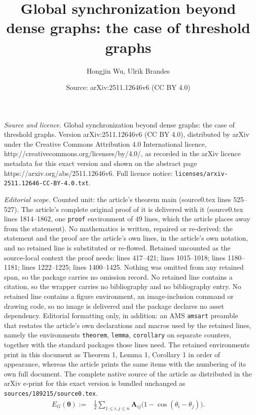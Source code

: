 \documentclass[10pt,a4paper]{amsart}
\title{Global synchronization beyond dense graphs: the case of threshold graphs}
\author{Hongjin Wu, Ulrik Brandes}
\date{Source: arXiv:2511.12646v6 (CC BY 4.0)}
\begin{document}
\maketitle

\noindent\emph{Source and licence.} Global synchronization beyond dense graphs: the case of threshold graphs. Version arXiv:2511.12646v6 (CC BY 4.0), distributed by arXiv under the Creative Commons Attribution 4.0 International licence, http://creativecommons.org/licenses/by/4.0/, as recorded in the arXiv licence metadata for this exact version and shown on the abstract page https://arxiv.org/abs/2511.12646v6. Full licence notice: \texttt{licenses/arxiv-2511.12646-CC-BY-4.0.txt}.\par\smallskip

\noindent\textit{Editorial scope.} Counted unit: the article's theorem main (source0.tex lines 525--527). The article's complete original proof of it is delivered with it (source0.tex lines 1814--1862, one \texttt{proof} environment of 49 lines, which the article places away from the statement). No mathematics is written, repaired or re-derived: the statement and the proof are the article's own lines, in the article's own notation, and no retained line is substituted or re-flowed.  Retained uncounted as the source-local context the proof needs: lines 417--421; lines 1015--1018; lines 1180--1181; lines 1222--1225; lines 1400--1425.  Nothing was omitted from any retained span, so the package carries no omission record.  No retained line contains a citation, so the wrapper carries no bibliography and no bibliography entry.  No retained line contains a figure environment, an image-inclusion command or drawing code, so no image is delivered and the package declares no asset dependency.  Editorial formatting only, in addition: an AMS \texttt{amsart} preamble that restates the article's own declarations and macros used by the retained lines, namely the environments \texttt{theorem}, \texttt{lemma}, \texttt{corollary} on separate counters, together with the standard packages those lines need.  The retained environments print in this document as Theorem 1, Lemma 1, Corollary 1 in order of appearance, whereas the article prints the same items with the numbering of its own full document.  The complete native source of the article as distributed in the arXiv e-print for this exact version is bundled unchanged as \texttt{sources/189215/source0.tex}.
\begin{equation}\label{E}
\begin{aligned}
    E_G(\boldsymbol\theta) := &\frac{1}{2} \sum_{1\leq i,j\leq n} \boldsymbol{A}_{ij} \big(1-\cos(\theta_i - \theta_j)\big). \\
    \end{aligned}
\end{equation}
\end{document}
